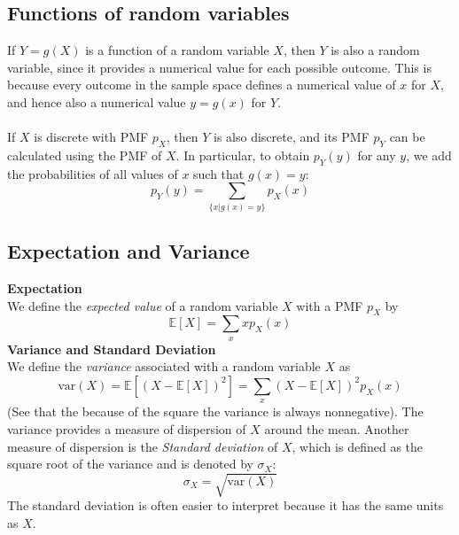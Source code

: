 \documentclass{report}
\begin{document}
\subsection{Functions of random variables}
If $Y=g(X)$ is a function of a random variable $X$, then $Y$ is also a random variable, since it provides a
numerical value for each possible outcome. This is because every outcome in the sample space defines a numerical 
value of $x$ for $X$, and hence also a numerical value $y=g(x)$ for $Y$.\\
\vspace{1mm}\\
If $X$ is discrete with PMF $p_X$, then $Y$ is also discrete, and its PMF $p_Y$ can be calculated using the PMF of
$X$. In particular, to obtain $p_Y(y)$ for any $y$, we add the probabilities
of all values of $x$ such that $g(x)=y$:
\begin{equation*}
p_Y(y)=\sum_{\{x|g(x)=y\}}p_X(x)
\end{equation*}

\subsection{Expectation and Variance}
\textbf{Expectation}\\
We define the \textit{expected value} of a random variable $X$ with a PMF $p_X$ by
\begin{equation*}
\boxed{\mathbb{E}[X]=\sum_xxp_X(x)}
\end{equation*}
\textbf{Variance and Standard Deviation}\\
We define the \textit{variance} associated with a random variable $X$ as
\begin{equation*}
\boxed{\text{var}(X)=\mathbb{E}\left[(X-\mathbb{E}[X])^2\right]=\sum_x(X-\mathbb{E}[X])^2p_X(x)}
\end{equation*}
(See that the because of the square the variance is always nonnegative). The variance provides a measure of
dispersion of $X$ around the mean. Another measure of dispersion is the \textit{Standard deviation} of $X$, which 
is defined as the square root of the variance and is denoted by $\sigma_X$:
\begin{equation*}
\boxed{\sigma_X=\sqrt{\text{var}(X)}}
\end{equation*}
The standard deviation is often easier to interpret because it has the same units as $X$.
\newpage
\end{document}
